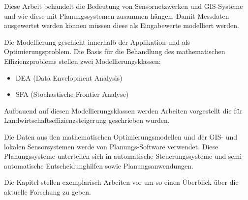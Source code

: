 Diese Arbeit behandelt die Bedeutung von Sensornetzwerken und GIS-Systeme und wie diese mit Planungssystemen zusammen hängen. Damit Messdaten ausgewertet werden können müssen diese als Eingabewerte modelliert werden. 

Die Modellierung geschieht innerhalb der Applikation und als Optimierungsproblem. Die Basis für die Behandlung des mathematischen Effizienzproblems stellen zwei Modellierungsklassen:

\begin{itemize}
	\item DEA (Data Envelopment Analysis)
	\item SFA (Stochastische Frontier Analyse)
\end{itemize}

Aufbauend auf diesen Modellierungsklassen werden Arbeiten vorgestellt die für Landwirtschaftseffizienzsteigerung geschrieben wurden.

Die Daten aus den mathematischen Optimierungsmodellen und der GIS- und lokalen Sensorsystemen werde von Planungs-Software verwendet. Diese Planungssysteme unterteilen sich in automatische Steuerungssysteme und semi-automatische Entscheidunghilfen sowie Planungsanwendungen. 

Die Kapitel stellen exemplarisch Arbeiten vor um so einen Überblick über die aktuelle Forschung zu geben.